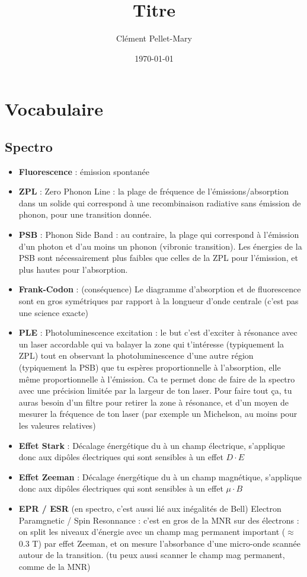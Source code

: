 \documentclass[a4paper]{report}
\title{Titre}
\author{Clément Pellet-Mary}
\date\today
\begin{document}
\chapter{Vocabulaire}
\section{Spectro}
\begin{itemize}
\item \textbf{Fluorescence} : émission spontanée
\item \textbf{ZPL} : Zero Phonon Line : la plage de fréquence de l'émissions/absorption dans un solide qui correspond à une recombinaison radiative sans émission de phonon, pour une transition donnée.
\item \textbf{PSB} : Phonon Side Band : au contraire, la plage qui correspond à l'émission d'un photon et d'au moins un phonon (vibronic transition). Les énergies de la PSB sont nécessairement plus faibles que celles de la ZPL pour l'émission, et plus hautes pour l'absorption.
\item \textbf{Frank-Codon} : (conséquence) Le diagramme d'absorption et de fluorescence sont en gros symétriques par rapport à la longueur d'onde centrale (c'est pas une science exacte)
\item \textbf{PLE} : Photoluminescence excitation : le but c'est d’exciter à résonance avec un laser accordable qui va balayer la zone qui t’intéresse (typiquement la ZPL) tout en observant la photoluminescence d'une autre région (typiquement la PSB) que tu espères proportionnelle à l'absorption, elle même proportionnelle à l'émission. Ca te permet donc de faire de la spectro avec une précision limitée par la largeur de ton laser. Pour faire tout ça, tu auras besoin d'un filtre pour retirer la zone à résonance, et d'un moyen de mesurer la fréquence de ton laser (par exemple un Michelson, au moins pour les valeures relatives)
\item \textbf{Effet Stark} : Décalage énergétique du à un champ électrique, s'applique donc aux dipôles électriques qui sont sensibles à un effet $D\cdot E$
\item \textbf{Effet Zeeman} : Décalage énergétique du à un champ magnétique, s'applique donc aux dipôles électriques qui sont sensibles à un effet $\mu \cdot B$
\item \textbf{EPR / ESR} (en spectro, c'est aussi lié aux inégalités de Bell) Electron Paramgnetic / Spin Resonnance : c'est en gros de la MNR sur des électrons : on split les niveaux d'énergie avec un champ mag permanent important ($\approx$ 0.3 T) par effet Zeeman, et on mesure l'absorbance d'une micro-onde scannée autour de la transition. (tu peux aussi scanner le champ mag permanent, comme de la MNR)


\end{itemize}
\end{document}
